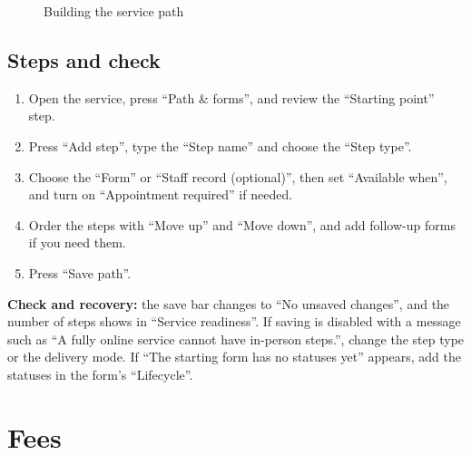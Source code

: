 \begin{figure}[H]
\centering
{}
\rclegend
\caption{Building the service path}
\label{fig:builder-services-path-flow}
\end{figure}

\subsection{Steps and check}
\begin{enumerate}
\item Open the service, press “Path \& forms”, and review the “Starting point” step.
\item Press “Add step”, type the “Step name” and choose the “Step type”.
\item Choose the “Form” or “Staff record (optional)”, then set “Available when”, and turn on “Appointment required” if needed.
\item Order the steps with “Move up” and “Move down”, and add follow-up forms if you need them.
\item Press “Save path”.
\end{enumerate}

\textbf{Check and recovery:} the save bar changes to “No unsaved changes”, and the number of steps shows in “Service readiness”. If saving is disabled with a message such as “A fully online service cannot have in-person steps.”, change the step type or the delivery mode. If “The starting form has no statuses yet” appears, add the statuses in the form's “Lifecycle”.

\clearpage
\section{Fees}
\label{sec:builder-feature-services-fees}

